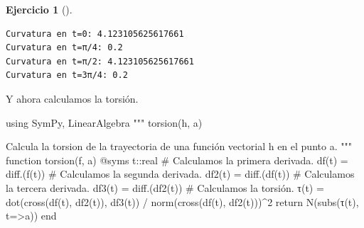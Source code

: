 \documentclass[
  a4paper,
]{scrreport}
\newenvironment{Shaded}{\begin{snugshade}}{\end{snugshade}}
\newcommand{\BuiltInTok}[1]{\textcolor[rgb]{0.00,0.23,0.31}{#1}}
\newcommand{\CommentTok}[1]{\textcolor[rgb]{0.37,0.37,0.37}{#1}}
\newcommand{\ConstantTok}[1]{\textcolor[rgb]{0.56,0.35,0.01}{#1}}
\newcommand{\ControlFlowTok}[1]{\textcolor[rgb]{0.00,0.23,0.31}{#1}}
\newcommand{\DataTypeTok}[1]{\textcolor[rgb]{0.68,0.00,0.00}{#1}}
\newcommand{\FloatTok}[1]{\textcolor[rgb]{0.68,0.00,0.00}{#1}}
\newcommand{\FunctionTok}[1]{\textcolor[rgb]{0.28,0.35,0.67}{#1}}
\newcommand{\ImportTok}[1]{\textcolor[rgb]{0.00,0.46,0.62}{#1}}
\newcommand{\KeywordTok}[1]{\textcolor[rgb]{0.00,0.23,0.31}{#1}}
\newcommand{\NormalTok}[1]{\textcolor[rgb]{0.00,0.23,0.31}{#1}}
\newcommand{\OperatorTok}[1]{\textcolor[rgb]{0.37,0.37,0.37}{#1}}
\newcommand{\PreprocessorTok}[1]{\textcolor[rgb]{0.68,0.00,0.00}{#1}}
\newcommand{\SpecialCharTok}[1]{\textcolor[rgb]{0.37,0.37,0.37}{#1}}
\newcommand{\StringTok}[1]{\textcolor[rgb]{0.13,0.47,0.30}{#1}}
\theoremstyle{definition}
\newtheorem{exercise}{Ejercicio}[chapter]
\theoremstyle{remark}
\begin{document}
\begin{exercise}[]
\begin{tcolorbox}
\begin{Shaded}
\end{Shaded}

\begin{verbatim}
Curvatura en t=0: 4.123105625617661
Curvatura en t=π/4: 0.2
Curvatura en t=π/2: 4.123105625617661
Curvatura en t=3π/4: 0.2
\end{verbatim}

Y ahora calculamos la torsión.

\begin{Shaded}
\begin{Highlighting}[]
\ImportTok{using} \BuiltInTok{SymPy}\NormalTok{, }\BuiltInTok{LinearAlgebra}
\StringTok{"""}
\StringTok{    torsion(h, a)}

\StringTok{Calcula la torsion de la trayectoria de una función vectorial h en el punto a.}
\StringTok{"""}
\KeywordTok{function} \FunctionTok{torsion}\NormalTok{(f, a)}
    \PreprocessorTok{@syms}\NormalTok{ t}\OperatorTok{::}\DataTypeTok{real}
    \CommentTok{\# Calculamos la primera derivada.}
    \FunctionTok{df}\NormalTok{(t) }\OperatorTok{=} \FunctionTok{diff}\NormalTok{.(}\FunctionTok{f}\NormalTok{(t))}
    \CommentTok{\# Calculamos la segunda derivada.}
    \FunctionTok{df2}\NormalTok{(t) }\OperatorTok{=} \FunctionTok{diff}\NormalTok{.(}\FunctionTok{df}\NormalTok{(t))}
    \CommentTok{\# Calculamos la tercera derivada.}
    \FunctionTok{df3}\NormalTok{(t) }\OperatorTok{=} \FunctionTok{diff}\NormalTok{.(}\FunctionTok{df2}\NormalTok{(t))}
    \CommentTok{\# Calculamos la torsión.}
    \FunctionTok{τ}\NormalTok{(t) }\OperatorTok{=} \FunctionTok{dot}\NormalTok{(}\FunctionTok{cross}\NormalTok{(}\FunctionTok{df}\NormalTok{(t), }\FunctionTok{df2}\NormalTok{(t)), }\FunctionTok{df3}\NormalTok{(t)) }\OperatorTok{/} \FunctionTok{norm}\NormalTok{(}\FunctionTok{cross}\NormalTok{(}\FunctionTok{df}\NormalTok{(t), }\FunctionTok{df2}\NormalTok{(t)))}\OperatorTok{\^{}}\FloatTok{2}
    \ControlFlowTok{return} \FunctionTok{N}\NormalTok{(}\FunctionTok{subs}\NormalTok{(}\FunctionTok{τ}\NormalTok{(t), t}\OperatorTok{=\textgreater{}}\NormalTok{a))}
\KeywordTok{end}


\end{Highlighting}
\end{Shaded}
\end{tcolorbox}
\end{exercise}
\end{document}

